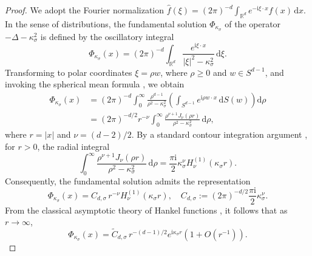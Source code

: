 \documentclass[12pt,reqno]{amsart}
\numberwithin{equation}{section}
\begin{document}
\begin{proof}
We adopt the Fourier normalization $\hat{f}(\xi) = (2\pi)^{-d} \int_{\mathbb{R}^d} e^{-\mathrm{i}\xi \cdot x} f(x)\,\mathrm{d}x$.\\
In the sense of distributions, the fundamental solution $\Phi_{\kappa_\sigma}$ of the operator $-\Delta - \kappa_\sigma^2$ is defined by the oscillatory integral
\begin{equation}\label{eq:fundamental-solution}
\Phi_{\kappa_\sigma}(x) = (2\pi)^{-d} \int_{\mathbb{R}^d} \frac{e^{\mathrm{i}\xi \cdot x}}{|\xi|^2 - \kappa_\sigma^2}\,\mathrm{d}\xi.
\end{equation}
Transforming to polar coordinates $\xi = \rho w$, where $\rho \ge 0$ and $w\in S^{d-1}$, and invoking the spherical mean formula \cite[p.\,154]{stein1971}, we obtain
\begin{align}\label{eq:polar-coordinates}
\Phi_{\kappa_\sigma}(x) &= (2\pi)^{-d} \int_0^\infty \frac{\rho^{d-1}}{\rho^2 - \kappa_\sigma^2} \left( \int_{S^{d-1}} e^{\mathrm{i}\rho w \cdot x}\,\mathrm{d}S(w) \right) \mathrm{d}\rho \nonumber \\
&= (2\pi)^{-d/2} r^{-\nu} \int_0^\infty \frac{\rho^{\nu+1} J_\nu(\rho r)}{\rho^2 - \kappa_\sigma^2}\,\mathrm{d}\rho,
\end{align}
where $r = |x|$ and $\nu = (d-2)/2$. By a standard contour integration argument \cite[Chapter~6]{watson1922}, for $r > 0$,  the radial integral
\begin{equation}\label{eq:integral-formula}
\int_0^\infty \frac{\rho^{\nu+1} J_\nu(\rho r)}{\rho^2 - \kappa_\sigma^2}\,\mathrm{d}\rho = \frac{\pi\mathrm{i}}{2} \kappa_\sigma^\nu H_\nu^{(1)}(\kappa_\sigma r).
\end{equation}
 Consequently, the fundamental solution admits the representation
\begin{equation}\label{eq:hankel-representation}
\Phi_{\kappa_\sigma}(x) = C_{d,\sigma}\, r^{-\nu} H_\nu^{(1)}(\kappa_\sigma r), \quad C_{d,\sigma} := (2\pi)^{-d/2} \frac{\pi\mathrm{i}}{2} \kappa_\sigma^\nu.
\end{equation}
From the classical asymptotic theory of Hankel functions \cite[\S10.17]{NIST:DLMF}, it follows that as $r \to \infty$,
\begin{equation}\label{eq:asymptotic-expansion}
\Phi_{\kappa_\sigma}(x) = \widetilde{C}_{d,\sigma}\, r^{-(d-1)/2} e^{\mathrm{i}\kappa_\sigma r} \left( 1 + O(r^{-1}) \right).
\end{equation}


\end{proof}
\end{document}

